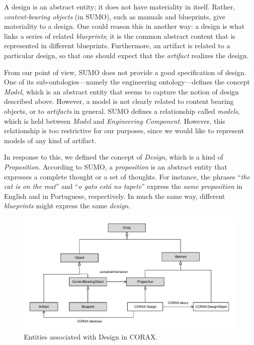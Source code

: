 \documentclass[preprint,12pt]{elsarticle}
\begin{document}
A design is an abstract entity; it does not have materiality in itself. Rather, \emph{content-bearing objects} (in SUMO), such as manuals and blueprints, give materiality to a design. One could reason this in another way: a design is what links a series of related \emph{blueprints}; it is the common abstract content that is represented in different blueprints. Furthermore, an artifact is related to a particular design, so that one should expect that the \emph{artifact} realizes the design.



From our point of view, SUMO does not provide a good specification of design. One of its sub-ontologies---namely the engineering ontology---defines the concept \emph{Model}, which is an abstract entity that seems to capture the notion of design described above. However, a model is not clearly related to content bearing objects, or to \emph{artifacts} in general. SUMO defines a relationship called \emph{models}, which is held between \emph{Model} and \emph{Engineering Component}. However, this relationship is too restrictive for our purposes, since we would like to represent models of any kind of artifact. 

In response to this, we defined the concept of \emph{Design}, which is a kind of \emph{Proposition}. According to SUMO, a \emph{proposition} is an abstract entity that expresses a complete thought or a set of thoughts. For instance, the phrases ``\textit{the cat is on the mat}'' and ``\textit{o gato est\'{a} no tapete}'' express the \emph{same} \emph{proposition} in English and in Portuguese, respectively. In much the same way, different \emph{blueprints} might express the same \emph{design}. 


\begin{figure}[th]
    \centering
    \includegraphics[width=1\textwidth]{figs/design}
    \caption{Entities associated with Design in CORAX.}
    \label{fig:design}
\end{figure}
\end{document}
